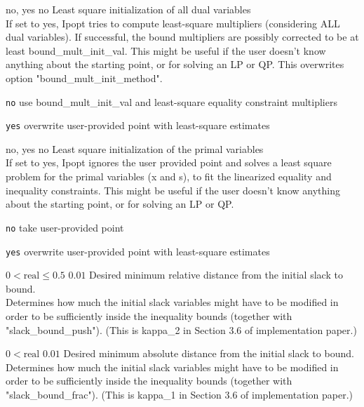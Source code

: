 %
{no, yes}%
{no}%
{Least square initialization of all dual variables\\
If set to yes, Ipopt tries to compute least-square multipliers (considering ALL dual variables).  If successful, the bound multipliers are possibly corrected to be at least bound\_mult\_init\_val. This might be useful if the user doesn't know anything about the starting point, or for solving an LP or QP.  This overwrites option "bound\_mult\_init\_method".}%
{\begin{list}{}{
\setlength{\parsep}{0em}
\setlength{\leftmargin}{5ex}
\setlength{\labelwidth}{2ex}
\setlength{\itemindent}{0ex}
\setlength{\topsep}{0pt}}
\item[\texttt{no}] use bound\_mult\_init\_val and least-square equality constraint multipliers
\item[\texttt{yes}] overwrite user-provided point with least-square estimates
\end{list}
}

%
{no, yes}%
{no}%
{Least square initialization of the primal variables\\
If set to yes, Ipopt ignores the user provided point and solves a least square problem for the primal variables (x and s), to fit the linearized equality and inequality constraints.  This might be useful if the user doesn't know anything about the starting point, or for solving an LP or QP.}%
{\begin{list}{}{
\setlength{\parsep}{0em}
\setlength{\leftmargin}{5ex}
\setlength{\labelwidth}{2ex}
\setlength{\itemindent}{0ex}
\setlength{\topsep}{0pt}}
\item[\texttt{no}] take user-provided point
\item[\texttt{yes}] overwrite user-provided point with least-square estimates
\end{list}
}

%
{$0<\textrm{real}\leq0.5$}%
{$0.01$}%
{Desired minimum relative distance from the initial slack to bound.\\
Determines how much the initial slack variables might have to be modified in order to be sufficiently inside the inequality bounds (together with "slack\_bound\_push").  (This is kappa\_2 in Section 3.6 of implementation paper.)}%
{}

%
{$0<\textrm{real}$}%
{$0.01$}%
{Desired minimum absolute distance from the initial slack to bound.\\
Determines how much the initial slack variables might have to be modified in order to be sufficiently inside the inequality bounds (together with "slack\_bound\_frac").  (This is kappa\_1 in Section 3.6 of implementation paper.)}%
{}

